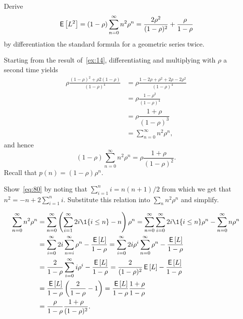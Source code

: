 \begin{extra}
 Derive
\begin{equation}\label{eq:80}
 \,\mathsf{E}\left[L^2\right]= (1-\rho) \sum_{n=0}^\infty n^2 \rho^n = \frac{2\rho^2}{(1-\rho)^2} + \frac{\rho}{1-\rho}
\end{equation}
by differentiation the standard formula for a geometric series twice.
\begin{solution}
 Starting from the result of~\cref{ex:14}, differentiating and multiplying with $\rho$ a second time yields
\begin{equation*}
 \begin{split}
\rho \frac{(1-\rho)^2 + \rho2(1-\rho)}{(1-\rho)^4} 
&= \rho \frac{1-2\rho+\rho^2 + 2\rho-2\rho^2}{(1-\rho)^4} \\
&= \rho \frac{1-\rho^2}{(1-\rho)^4} \\
&=\rho \dfrac{1+\rho}{(1-\rho)^3}\\
&=\sum_{n=0}^{\infty}n^2\rho^n,
 \end{split}
\end{equation*}
and hence
\begin{equation*}
(1-\rho)\sum_{n=0}^{\infty}n^2\rho^n = \rho\dfrac{1+\rho}{(1-\rho)^2}.
\end{equation*}
Recall that $p(n) = (1-\rho)\rho^n$. 
\end{solution}
\end{extra}


\begin{extra} Show~\cref{eq:80} by noting that
$\sum_{i=1}^n i= n(n+1)/2$ from which we get that
$n^2 = -n + 2\sum_{i=1}^n i$. Substitute this relation into
$\sum_n n^2 \rho^n$ and simplify.
\begin{solution}
\begin{align*}
 \sum_{n=0}^\infty n^2 \rho^n 
&= \sum_{n=0}^\infty \left(\sum_{i=1}^\infty 2i \1{i\leq n} - n\right)\rho^n 
= \sum_{n=0}^\infty \sum_{i=0}^\infty 2i\1{i\leq n}\rho^n - \sum_{n=0}^\infty n\rho^n \\
&= \sum_{i=0}^\infty 2i \sum_{n=i}^\infty \rho^n - \frac{\E L}{1-\rho} 
= \sum_{i=0}^\infty 2i \rho^i \sum_{n=0}^\infty \rho^n - \frac{\E L}{1-\rho} \\
&= \frac2{1-\rho} \sum_{i=0}^\infty i \rho^i - \frac{\E L}{1-\rho} 
= \frac2{(1-\rho)^2} \E L - \frac{\E L}{1-\rho} \\
&= \frac{\E L}{1-\rho} \left(\frac2{1-\rho} - 1\right) 
= \frac{\E L}{1-\rho} \frac{1+\rho}{1-\rho} \\
&= \frac{\rho}{1-\rho} \frac{1+\rho}{(1-\rho)^2}.
\end{align*}
\end{solution}
\end{extra}

